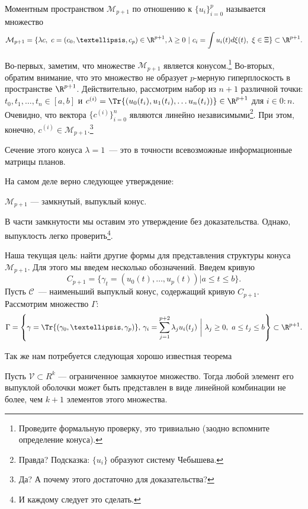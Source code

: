 \begin{dfn}
Моментным пространством $\mathcal{M}_{p+1}$ по отношению к $\{u_i\}_{i=0}^{p}$ называется множество 
$$\mathcal{M}_{p+1} = \{ \lambda c, c = (c_0, …, c_p) \in \R^{p+1}, \lambda \ge 0 | c_i = \int u_i(t)d\xi(t), \xi \in \Xi \} \subset \R^{p + 1}.$$
\end{dfn}

Во-первых, заметим, что множестве $\mathcal M_{p + 1}$ является конусом.\footnote{Проведите формальную проверку, это тривиально (заодно вспомните определение конуса).}
Во-вторых, обратим внимание, что это множество не образует $p$-мерную гиперплоскость в пространстве $\R^{p + 1}$.
Действительно, рассмотрим набор из $n + 1$ различной точки: $t_0, t_1, \ldots, t_n \in [a, b]$ и $c^{(i)} = \Tr{(u_0(t_i), u_1(t_i), \ldots u_n(t_i))} \in \R^{p + 1}$ для $i \in 0:n$.
Очевидно, что вектора $\{c^{(i)}\}_{i=0}^n$ являются линейно независимыми\footnote{Правда? Подсказка: $\{u_i\}$ образуют систему Чебышева.}. 
При этом, конечно, $c^{(i)} \in \mathcal M_{p + 1}$.\footnote{Да? А почему этого достаточно для доказательства?}

Сечение этого конуса $\lambda = 1$ — это в точности всевозможные информационные матрицы планов.

На самом деле верно следующее утверждение:
\begin{thm}
    $\mathcal M_{p + 1}$ --- замкнутый, выпуклый конус.
\end{thm}
В части замкнутости мы оставим это утверждение без доказательства. Однако, выпуклость легко проверить\footnote{И каждому следует это сделать.}.

Наша текущая цель: найти другие формы для представления структуры конуса $\mathcal M_{p + 1}$. Для этого мы введем несколько обозначений.
Введем кривую
$$C_{p+1} = \{ \gamma_t = (u_0(t), …, u_{p}(t)) | a\leq t \leq b\}.$$
Пусть $\mathcal{C}$ — наименьший выпуклый конус, содержащий кривую $C_{p+1}$. Рассмотрим множество $\Gamma$:
$$ \Gamma = \left\{ \gamma = \Tr{(\gamma_0, …, \gamma_p)}, \, \gamma_i = \sum \limits_{j=1}^{p+2} \lambda_j u_i(t_j) \ \bigg | \ \lambda_j \geq 0, a \leq t_j \leq b \right\} \subset \R^{p + 1}.$$

Так же нам потребуется следующая хорошо известная теорема
\begin{thm}
    \label{karateodoriThm}
    Пусть $\mathcal{V} \subset R^{k}$ — ограниченное замкнутое множество. Тогда любой элемент его выпуклой оболочки может быть представлен в виде линейной комбинации не более, чем $k+1$ элементов этого множества.
\end{thm}

